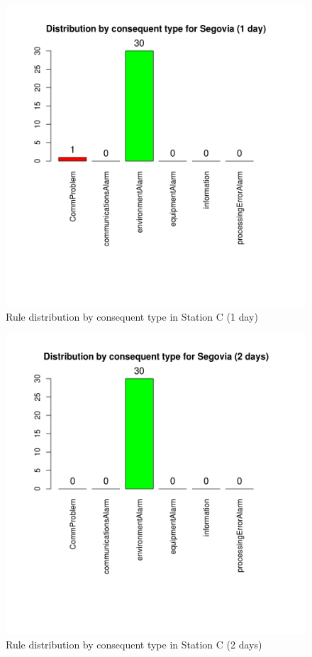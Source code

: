 \begin{figure}[hbtp]
\includegraphics[width=\textwidth]{img/conseqtypes_seg1.png}
\caption{Rule distribution by consequent type in Station C (1 day)} \label{fig:conseqtypes_seg1}
\end{figure}

\begin{figure}[hbtp]
\includegraphics[width=\textwidth]{img/conseqtypes_seg2.png}
\caption{Rule distribution by consequent type in Station C (2 days)} \label{fig:conseqtypes_seg2}
\end{figure}


